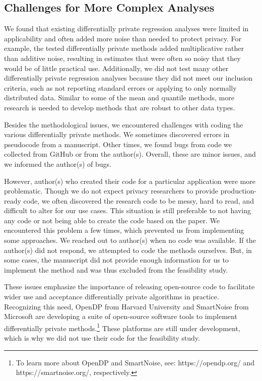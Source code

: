 \subsection{Challenges for More Complex Analyses}
We found that existing differentially private regression analyses were limited in applicability and often added more noise than needed to protect privacy. For example, the tested differentially private methods added multiplicative rather than additive noise, resulting in estimates that were often so noisy that they would be of little practical use. Additionally, we did not test many other differentially private regression analyses because they did not meet our inclusion criteria, such as not reporting standard errors or applying to only normally distributed data. Similar to some of the mean and quantile methods, more research is needed to develop methods that are robust to other data types.

Besides the methodological issues, we encountered challenges with coding the various differentially private methods. We sometimes discovered errors in pseudocode from a manuscript. Other times, we found bugs from code we collected from GitHub or from the author(s). Overall, these are minor issues, and we informed the author(s) of bugs.

However, author(s) who created their code for a particular application were more problematic. Though we do not expect privacy researchers to provide production-ready code, we often discovered the research code to be messy, hard to read, and difficult to alter for our use cases. This situation is still preferable to not having any code or not being able to create the code based on the paper. We encountered this problem a few times, which prevented us from implementing some approaches. We reached out to author(s) when no code was available. If the author(s) did not respond, we attempted to code the methods ourselves. But, in some cases, the manuscript did not provide enough information for us to implement the method and was thus excluded from the feasibility study.

These issues emphasize the importance of releasing open-source code to facilitate wider use and acceptance differentially private algorithms in practice. Recognizing this need, OpenDP from Harvard University and SmartNoise from Microsoft are developing a suite of open-source software tools to implement differentially private methods.\footnote{To learn more about OpenDP and SmartNoise, see: https://opendp.org/ and https://smartnoise.org/, respectively.} These platforms are still under development, which is why we did not use their code for the feasibility study.

